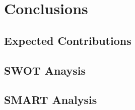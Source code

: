 \chapter{Conclusions} \label{chap:conclusions}

\section{Expected Contributions}

\section{SWOT Anaysis}

\section{SMART Analysis}
